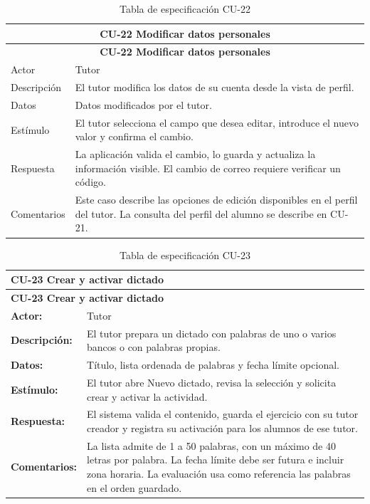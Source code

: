 \begin{longtable}{|p{4cm}|p{11cm}|}
\caption{Tabla de especificación CU-22}
\label{tab:cu22} \\

\hline
\multicolumn{2}{|c|}{\textbf{CU-22 Modificar datos personales}} \\
\hline
\endfirsthead

\hline
\multicolumn{2}{|c|}{\textbf{CU-22 Modificar datos personales}} \\
\hline
\endhead

\hline
\endfoot
\endlastfoot

Actor & Tutor \\
\hline

Descripción & El tutor modifica los datos de su cuenta desde la vista de perfil. \\
\hline

Datos & Datos modificados por el tutor. \\
\hline

Estímulo & El tutor selecciona el campo que desea editar, introduce el nuevo valor y confirma el cambio. \\
\hline

Respuesta & La aplicación valida el cambio, lo guarda y actualiza la información visible. El cambio de correo requiere verificar un código. \\
\hline

Comentarios & Este caso describe las opciones de edición disponibles en el perfil del tutor. La consulta del perfil del alumno se describe en CU-21. \\
\hline

\end{longtable}

\begin{longtable}{|p{3.2cm}|p{11.8cm}|}
\caption{Tabla de especificación CU-23}\label{tab:cu23} \\ \hline
\multicolumn{2}{|p{15cm}|}{\textbf{CU-23 Crear y activar dictado}} \\ \hline
\endfirsthead
\hline
\multicolumn{2}{|p{15cm}|}{\textbf{CU-23 Crear y activar dictado}} \\ \hline
\endhead
\textbf{Actor:} & Tutor \\ \hline
\textbf{Descripción:} & El tutor prepara un dictado con palabras de uno o varios bancos o con palabras propias. \\ \hline
\textbf{Datos:} & Título, lista ordenada de palabras y fecha límite opcional. \\ \hline
\textbf{Estímulo:} & El tutor abre Nuevo dictado, revisa la selección y solicita crear y activar la actividad. \\ \hline
\textbf{Respuesta:} & El sistema valida el contenido, guarda el ejercicio con su tutor creador y registra su activación para los alumnos de ese tutor. \\ \hline
\textbf{Comentarios:} & La lista admite de 1 a 50 palabras, con un máximo de 40 letras por palabra. La fecha límite debe ser futura e incluir zona horaria. La evaluación usa como referencia las palabras en el orden guardado. \\ \hline
\end{longtable}

